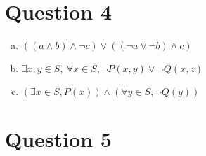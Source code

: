 \documentclass[12pt]{article}
\begin{document}
\section*{Question 4}
\begin{enumerate}[a.]
    \item $((a \land b) \land \neg c) \lor ((\neg a \lor \neg b) \land c)$
    \item $\exists x,y \in S,\:\forall x \in S, \neg P(x,y) \lor \neg Q(x,z)$
    \item $(\exists x \in S, P(x)) \land (\forall y \in S, \neg Q(y))$
\end{enumerate}

\section*{Question 5}
\end{document}
